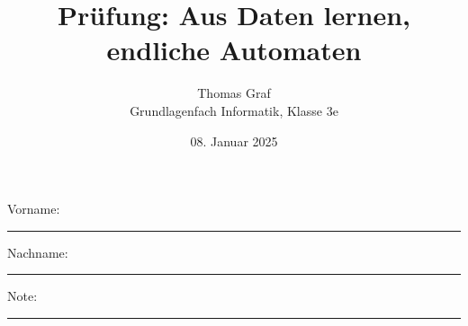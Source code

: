 \newtoggle{withbonus} \toggletrue{withbonus} %

\newcommand{\mycourse}{Grundlagenfach Informatik}
\newcommand{\myclass}{Klasse 3e}
\newcommand{\mydate}{08. Januar 2025}

\title{\textbf{Prüfung: Aus Daten lernen, endliche Automaten}}
\author{Thomas Graf\\
	\mycourse, \myclass}
\date{\mydate}
\maketitle
\thispagestyle{headandfoot}

\begin{center}
\end{center}
\vspace{10mm}

\begin{center}
	Vorname: \rule{45mm}{0.8pt}\qquad Nachname: \rule{45mm}{0.8pt}
\end{center}
\vspace{20mm}

\begin{center}
	\iftoggle{withbonus} {
		\combinedgradetable[h][questions]
	} {
		\gradetable[h][questions]
	}
\end{center}
\vspace{15mm}
\begin{center}
	Note:
	\vspace{10mm}

	\rule{8mm}{1.2pt}
\end{center}
\clearpage

